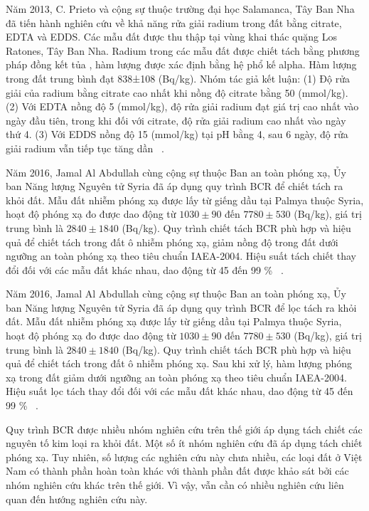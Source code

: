 Năm 2013, C. Prieto và cộng sự thuộc trường đại học Salamanca, Tây Ban Nha đã tiến hành nghiên cứu về khả năng rửa giải radium trong đất bằng citrate, EDTA và EDDS. Các mẫu đất được thu thập tại vùng khai thác quặng Los Ratones, Tây Ban Nha. Radium trong các mẫu đất được chiết tách bằng phương pháp đồng kết tủa , hàm lượng được xác định bằng hệ phổ kế alpha. Hàm lượng  trong đất trung bình đạt 838±108 (Bq/kg). Nhóm tác giả kết luận: (1) Độ rửa giải của radium bằng citrate cao nhất khi nồng độ citrate bằng 50 (mmol/kg). (2) Với EDTA nồng độ 5 (mmol/kg), độ rửa giải radium đạt giá trị cao nhất vào ngày đầu tiên, trong khi đối với citrate, độ rửa giải radium cao nhất vào ngày thứ 4. (3) Với EDDS nồng độ 15 (mmol/kg) tại pH bằng 4, sau 6 ngày, độ rửa giải radium vẫn tiếp tục tăng dần  ~\cite{RaSoil:C.Prieto}.    

Năm 2016, Jamal Al Abdullah cùng cộng sự thuộc Ban an toàn phóng xạ, Ủy ban Năng lượng Nguyên tử Syria đã áp dụng quy trình BCR để chiết tách  ra khỏi đất. Mẫu đất nhiễm phóng xạ  được lấy từ giếng dầu tại Palmya thuộc Syria, hoạt độ phóng xạ  đo được dao động từ $1030 \pm  90$ đến $7780 \pm 530$ (Bq/kg), giá trị trung bình là $2840 \pm 1840$ (Bq/kg). Quy trình chiết tách BCR phù hợp và hiệu quả để chiết tách  trong đất ô nhiễm phóng xạ, giảm nồng độ  trong đất dưới ngưỡng an toàn phóng xạ theo tiêu chuẩn IAEA-2004. Hiệu suất tách chiết  thay đổi đối với các mẫu đất khác nhau, dao động từ 45 đến 99 \% ~\cite{BCR:JamalAlAbdullah}.

Năm 2016, Jamal Al Abdullah cùng cộng sự thuộc Ban an toàn phóng xạ, Ủy ban Năng lượng Nguyên tử Syria đã áp dụng quy trình BCR để lọc tách  ra khỏi đất. Mẫu đất nhiễm phóng xạ  được lấy từ giếng dầu tại Palmya thuộc Syria, hoạt độ phóng xạ  đo được dao động từ $1030 \pm 90$ đến $7780 \pm 530$ (Bq/kg), giá trị trung bình là $2840 \pm 1840$ (Bq/kg). Quy trình chiết tách BCR phù hợp và hiệu quả để chiết tách  trong đất ô nhiễm phóng xạ. Sau khi xử lý, hàm lượng phóng xạ  trong đất giảm dưới ngưỡng an toàn phóng xạ theo tiêu chuẩn IAEA-2004. Hiệu suất lọc tách  thay đổi đối với các mẫu đất khác nhau, dao động từ 45 đến 99 \% ~\cite{BCR:JamalAlAbdullah}.

Quy trình BCR được nhiều nhóm nghiên cứu trên thế giới áp dụng tách chiết các nguyên tố kim loại ra khỏi đất. Một số ít nhóm nghiên cứu đã áp dụng tách chiết phóng xạ. Tuy nhiên, số lượng các nghiên cứu này chưa nhiều, các loại đất ở Việt Nam có thành phần hoàn toàn khác với thành phần đất được khảo sát bởi các nhóm nghiên cứu khác trên thế giới. Vì vậy, vẫn cần có nhiều nghiên cứu liên quan đến hướng nghiên cứu này.



